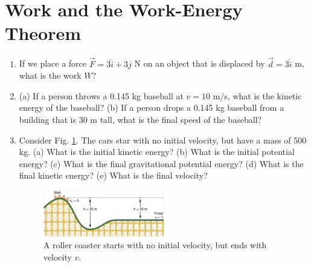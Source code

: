 \documentclass[10pt]{article}
\begin{document}
\section{Work and the Work-Energy Theorem}
\begin{enumerate}
\item If we place a force $\vec{F} = 3 \hat{i} + 3\hat{j}$ N on an object that is displaced by $\vec{d} = 3\hat{i}$ m, what is the work $W$? \\ \vspace{0.75cm}
\item (a) If a person throws a 0.145 kg baseball at $v=10$ m/s, what is the kinetic energy of the baseball?  (b) If a person drops a 0.145 kg baseball from a building that is 30 m tall, what is the final speed of the baseball? \\ \vspace{1cm}
\item Consider Fig. \ref{fig:coaster}.  The cars star with no initial velocity, but have a mass of 500 kg.  (a) What is the initial kinetic energy? (b) What is the initial potential energy? (c) What is the final gravitational potential energy? (d) What is the final kinetic energy? (e) What is the final velocity?
\begin{figure}[ht]
\centering
\includegraphics[width=0.5\textwidth]{figures/coaster.png}
\caption{\label{fig:coaster} A roller coaster starts with no initial velocity, but ends with velocity $v$.}
\end{figure}
\end{enumerate}
\end{document}
